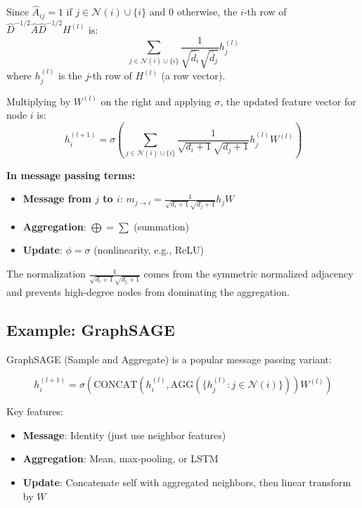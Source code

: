 \begin{notechapter}
\begin{example}
Since $\hat{A}_{ij} = 1$ if $j \in \mathcal{N}(i) \cup \{i\}$ and $0$ 
otherwise, the $i$-th row of $\hat{D}^{-1/2} \hat{A} \hat{D}^{-1/2} H^{(l)}$ is:
\[
\sum_{j \in \mathcal{N}(i) \cup \{i\}} 
    \frac{1}{\sqrt{\hat{d}_i}\sqrt{\hat{d}_j}} h_j^{(l)}
\]
where $h_j^{(l)}$ is the $j$-th row of $H^{(l)}$ (a row vector).

Multiplying by $W^{(l)}$ on the right and applying $\sigma$, the 
updated feature vector for node $i$ is:
\[
h_i^{(l+1)} = \sigma\left( \sum_{j \in \mathcal{N}(i) \cup \{i\}} 
    \frac{1}{\sqrt{d_i + 1}\sqrt{d_j + 1}} h_j^{(l)} W^{(l)} \right)
\]

\textbf{In message passing terms:}
\begin{itemize}
    \item \textbf{Message from $j$ to $i$}: 
          $m_{j \to i} = \frac{1}{\sqrt{d_i+1}\sqrt{d_j+1}} h_j W$
    \item \textbf{Aggregation}: $\bigoplus = \sum$ (summation)
    \item \textbf{Update}: $\phi = \sigma$ (nonlinearity, e.g., ReLU)
\end{itemize}

The normalization $\frac{1}{\sqrt{d_i+1}\sqrt{d_j+1}}$ comes from the 
symmetric normalized adjacency and prevents high-degree nodes from 
dominating the aggregation.
\end{example}

\subsection{Example: GraphSAGE}

GraphSAGE \cite{dft-to-gnn:hamilton2017inductive} (Sample and Aggregate) is a popular message passing variant:

\begin{example}
\[
h_i^{(l+1)} = \sigma\left( 
    \text{CONCAT}\left( 
    h_i^{(l)}, \text{AGG}(\{h_j^{(l)} : j \in \mathcal{N}(i)\}) 
    \right) W^{(l)} \right)
\]

Key features:
\begin{itemize}
    \item \textbf{Message}: Identity (just use neighbor features)
    \item \textbf{Aggregation}: Mean, max-pooling, or LSTM
    \item \textbf{Update}: Concatenate self with aggregated neighbors, 
          then linear transform by $W$
\end{itemize}


\end{example}
\end{notechapter}
